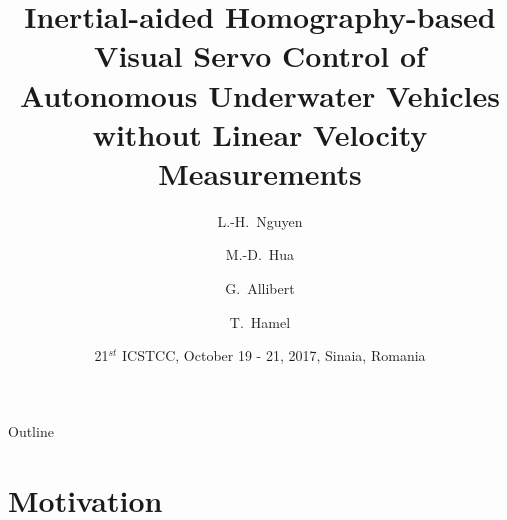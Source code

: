 \documentclass{beamer}
\title[AUV control without linear velocity measurements] %
{Inertial-aided Homography-based Visual Servo Control of Autonomous Underwater Vehicles without Linear Velocity Measurements}
\author[Nguyen, Hua, Allibert and Hamel] %
{L.-H.~Nguyen \and M.-D.~Hua \and G.~Allibert \and T.~Hamel}
\institute[Universities of Somewhere and Elsewhere] %
{
	\textit{I3S Laboratory, CNRS, Universit\'e C\^ote d'Azur}\\
	Sophia Antipolis, France \\
	lhnguyen(hua,allibert,thamel)@i3s.unice.fr}
\date[ICSTCC 2017] %
{21$^{st}$ ICSTCC, October 19 - 21, 2017, Sinaia, Romania}
\begin{document}
\begin{frame}
  \titlepage
\end{frame}

\begin{frame}{Outline}
  \tableofcontents
\end{frame}





\section{Motivation}

\end{document}
